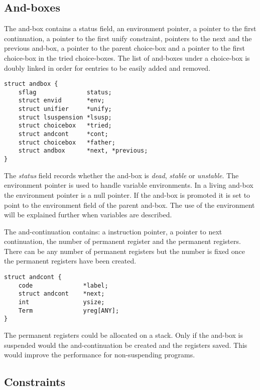 \subsection*{And-boxes}

The and-box contains a status field, an environment pointer, a pointer
to the first continuation, a pointer to the first unify constraint,
pointers to the next and the previous and-box, a pointer to the parent
choice-box and a pointer to the first choice-box in the tried
choice-boxes. The list of and-boxes under a choice-box is doubly
linked in order for eentries to be easily added and removed.

\begin{verbatim}
struct andbox {
    sflag              status;
    struct envid       *env;
    struct unifier     *unify;
    struct lsuspension *lsusp;
    struct choicebox   *tried;
    struct andcont     *cont;
    struct choicebox   *father;
    struct andbox      *next, *previous;
}
\end{verbatim}


The {\em status} field records whether the and-box is {\em dead}, {\em
stable} or {\em unstable}. The environment pointer is used to handle
variable environments. In a living and-box the environment pointer is
a null pointer. If the and-box is promoted it is set to point to the
environment field of the parent and-box. The use of the environment
will be explained further when variables are described.


The and-continuation contains: a instruction pointer, a pointer to
next continuation, the number of permanent register and the permanent
registers. There can be any number of permanent registers but the
number is fixed once the permanent registers have been created.

\begin{verbatim}
struct andcont {
    code              *label;
    struct andcont    *next;
    int	              ysize;
    Term              yreg[ANY];
}
\end{verbatim}

The permanent registers could be allocated on a stack. Only if the
and-box is suspended would the and-continuation be created and the registers 
saved. This would improve the performance for non-suspending programs.

\subsection*{Constraints}

